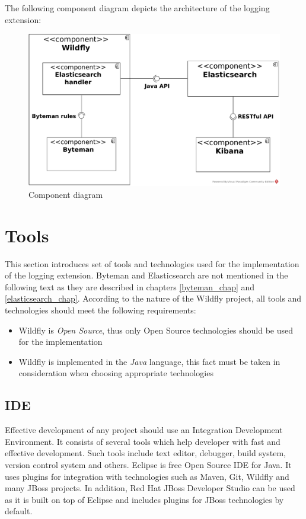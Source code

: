 \documentclass[12pt,oneside]{fithesis2}
\begin{document}
The following component diagram depicts the architecture of the logging extension:

\begin{figure}[ht!]
	\centering
	\includegraphics[width=\textwidth]{images/component_diagram}
	\caption{Component diagram}
	\label{jboss_modules_image}
\end{figure}

\section{Tools}
This section introduces set of tools and technologies used for the implementation of the logging extension. Byteman and Elasticsearch are not mentioned in the following text as they are described in chapters \ref{byteman_chap} and \ref{elasticsearch_chap}. According to the nature of the Wildfly project, all tools and technologies should meet the following requirements:

\begin{itemize}
	\item Wildfly is \textit{Open Source}, thus only Open Source technologies should be used for the implementation
	\item Wildfly is implemented in the \textit{Java} language, this fact must be taken in consideration when choosing appropriate technologies
\end{itemize}

\subsection{IDE}
Effective development of any project should use an Integration Development Environment. It consists of several tools which help developer with fast and effective development. Such tools include text editor, debugger, build system, version control system and others. Eclipse is free Open Source IDE for Java. It uses plugins for integration with technologies such as Maven, Git, Wildfly and many JBoss projects. In addition, Red Hat JBoss Developer Studio can be used as it is built on top of Eclipse and includes plugins for JBoss technologies by default.
\end{document}
